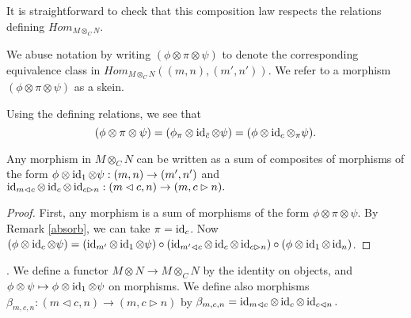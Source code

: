 \begin{definition}
    \begin{center}
    
  \end{center}

  It is straightforward to check that this composition law respects the
  relations defining $Hom_{M\otimes_C N}$.
\end{definition}

\begin{remark}
 
We abuse notation by writing $(\phi\otimes\pi\otimes\psi)$ to denote the
corresponding equivalence class in $Hom_{M\otimes_C N}((m,n),(m',n'))$. We
refer to a morphism $(\phi\otimes\pi\otimes\psi)$ as a skein.\end{remark}


\begin{remark}\label{absorb}
  
  Using the defining relations, we see
  that
  \[
    (\phi\otimes\pi\otimes\psi) =
    (\phi_{\pi}\otimes\operatorname{id}_{\bar{c}}\otimes\psi) =
    (\phi\otimes\operatorname{id}_c\otimes{_{\pi}\psi}).
  \]
\end{remark}

\begin{lemma}\label{decompose}
  Any morphism in $M\otimes_C N$ can be written as a sum of composites of
  morphisms of the form $\phi\otimes\operatorname{id}_{1}\otimes\psi:(m,n)\to(m',n')$ and
  $\operatorname{id}_{m\lhd c}\otimes\operatorname{id}_c\otimes\operatorname{id}_{c\rhd n}:(m\lhd c,n)\to(m,c\rhd n).$
\end{lemma}

\begin{proof}
  First, any morphism is a sum of morphisms of the form
  $\phi\otimes\pi\otimes\psi$. By Remark \ref{absorb}, we can take
  $\pi=\operatorname{id}_c$. Now
  $(\phi\otimes\operatorname{id}_c\otimes\psi)
  =
  (\operatorname{id}_{m'}\otimes\operatorname{id}_1\otimes\psi)
  \circ
  (\operatorname{id}_{m'\lhd c}\otimes\operatorname{id}_c\otimes\operatorname{id}_{c\rhd n})
  \circ
  (\phi\otimes\operatorname{id}_1\otimes\operatorname{id}_n)$.
\end{proof}


\begin{definition}\label{definition/preskeinification}.
  We define a functor $M\otimes N\to M\otimes_C N$ by the identity on objects,
  and $\phi\otimes\psi\mapsto\phi\otimes\operatorname{id}_1\otimes\psi$ on morphisms. We
  define also morphisms $\beta_{m,c,n}:(m\lhd c,n)\to (m, c \rhd n)$ by
  $\beta_{m,c,n}=\operatorname{id}_{m\lhd c}\otimes\operatorname{id}_c\otimes\operatorname{id}_{c\lhd n}.$

  \begin{center}\end{center}

\end{definition}

